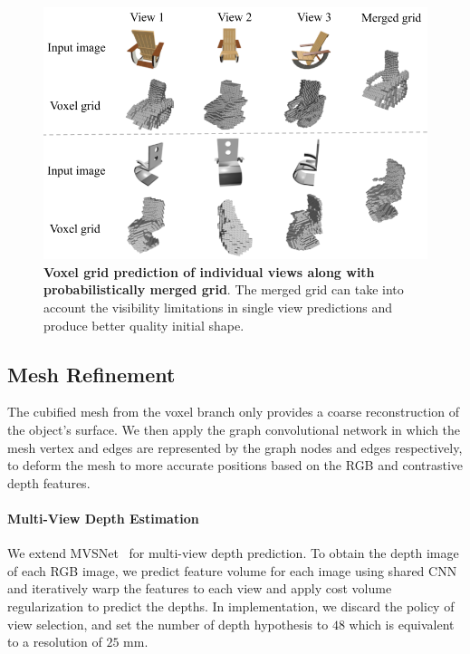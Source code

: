 \begin{figure}[th!]
    \begin{center}
        \includegraphics[width=\linewidth]{imgs/initial_vox.png}
    \end{center}
        \caption{\textbf{Voxel grid prediction of individual views along with probabilistically merged grid}. The merged grid can take into account the visibility limitations in single view predictions and produce better quality initial shape.}
        \label{fig:initial_vox}
\end{figure}

\subsection{Mesh Refinement}
\label{subsec:mesh_refinement}
The cubified mesh from the voxel branch only provides a coarse reconstruction of the object's surface. 
We then apply the graph convolutional network in which the mesh vertex and edges are represented by the graph nodes and edges respectively, to deform the mesh to more accurate positions based on the RGB and contrastive depth features.
\label{subsec:depth_prediction}
\paragraph{Multi-View Depth Estimation}\vspace{-4mm}
We extend MVSNet~\cite{yao2018mvsnet} for multi-view depth prediction.
To obtain the depth image of each RGB image, we predict feature volume for each image using shared CNN and iteratively warp the features to each view and apply cost volume regularization to predict the depths.
In implementation, we discard the policy of view selection, and set the number of depth hypothesis to $48$ which is equivalent to a resolution of $25$ mm.

